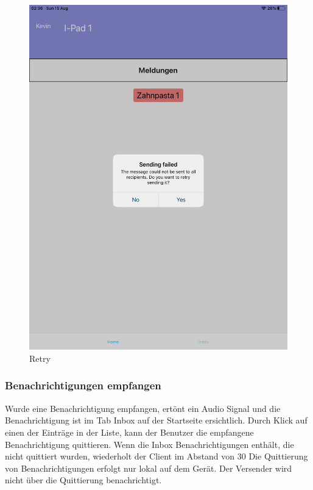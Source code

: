 \begin{figure}[h]
\begin{minipage}[b]{0.4\textwidth}
        \includegraphics[width=\textwidth]{graphics/screenshots/mobileclient/screenshot-retry}
        \caption{Retry}
    \end{minipage}
    \label{fig:MobileClient-Screens2}
\end{figure}

\clearpage

\subsubsection*{Benachrichtigungen empfangen}

Wurde eine Benachrichtigung empfangen, ertönt ein Audio Signal und die Benachrichtigung ist im Tab Inbox auf der Startseite ersichtlich.
Durch Klick auf einen der Einträge in der Liste, kann der Benutzer die empfangene Benachrichtigung quittieren.
Wenn die Inbox Benachrichtigungen enthält, die nicht quittiert wurden, wiederholt der Client im Abstand von 30
Die Quittierung von Benachrichtigungen erfolgt nur lokal auf dem Gerät.
Der Versender wird nicht über die Quittierung benachrichtigt.

